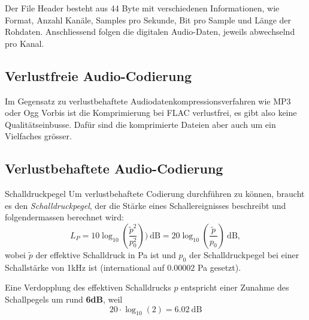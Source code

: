 Der File Header besteht aus 44 Byte mit verschiedenen Informationen, wie Format, Anzahl Kanäle, Samples pro Sekunde, Bit pro Sample und Länge der Rohdaten.
Anschliessend folgen die digitalen Audio-Daten, jeweils abwechselnd pro Kanal.

\subsection{Verlustfreie Audio-Codierung}\label{subsec:verlustfreie-audio-codierung}

Im Gegensatz zu verlustbehaftete Audiodatenkompressionsverfahren wie MP3 oder Ogg Vorbis ist die Komprimierung bei FLAC verlustfrei, es gibt also keine Qualitätseinbusse.
Dafür sind die komprimierte Dateien aber auch um ein Vielfaches grösser.

\subsection{Verlustbehaftete Audio-Codierung}\label{subsec:verlustbehaftete-audio-codierung}

\begin{definition}{Schalldruckpegel}
    Um verlustbehaftete Codierung durchführen zu können, braucht es den \emph{Schalldruckpegel}, der die Stärke eines Schallereignisses beschreibt und folgendermassen berechnet wird:
    \[L_P = 10 \log_{10} \left( \frac{\tilde{p}^2}{p_0^2} \right)) \ \text{dB} = 20 \log_{10} \left( \frac{\tilde{p}}{p_0} \right) \ \text{dB},\] wobei $\tilde{p}$ der effektive Schalldruck in Pa ist und $p_0$ der Schalldruckpegel bei einer Schallstärke von 1kHz ist (international auf $0.00002$ Pa gesetzt).
\end{definition}
Eine Verdopplung des effektiven Schalldrucks $p$ entspricht einer Zunahme des Schallpegels um rund \textbf{6dB}, weil \[20 \cdot \log_{10}(2) = 6.02 \ \text{dB}\]
